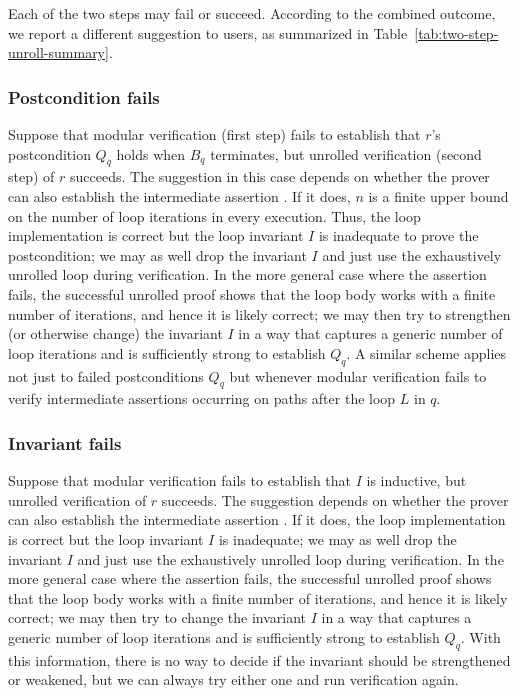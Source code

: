 Each of the two steps may fail or succeed.
According to the combined outcome, we report a different suggestion to users, as summarized in Table~\ref{tab:two-step-unroll-summary}.

\subsubsection{Postcondition fails}

Suppose that modular verification (first step) fails to establish that $r$'s postcondition $Q_q$ holds when $B_q$ terminates, but unrolled verification (second step) of $r$ succeeds.
The suggestion in this case depends on whether the prover can also establish the intermediate assertion .
If it does, $n$ is a finite upper bound on the number of loop iterations in every execution.
Thus, the loop implementation is correct but the loop invariant $I$ is inadequate to prove the postcondition; we may as well drop the invariant $I$ and just use the exhaustively unrolled loop during verification.
In the more general case where the assertion  fails, the successful unrolled proof shows that the loop body works with a finite number of iterations, and hence it is likely correct; we may then try to strengthen (or otherwise change) the invariant $I$ in a way that captures a generic number of loop iterations and is sufficiently strong to establish $Q_q$.
A similar scheme applies not just to failed postconditions $Q_q$ but whenever modular verification fails to verify intermediate assertions occurring on paths after the loop $L$ in $q$.


\subsubsection{Invariant fails}

Suppose that modular verification fails to establish that $I$ is inductive, but unrolled verification of $r$ succeeds.
The suggestion depends on whether the prover can also establish the intermediate assertion .
If it does, the loop implementation is correct but the loop invariant $I$ is inadequate; we may as well drop the invariant $I$ and just use the exhaustively unrolled loop during verification.
In the more general case where the assertion  fails, the successful unrolled proof shows that the loop body works with a finite number of iterations, and hence it is likely correct; we may then try to change the invariant $I$ in a way that captures a generic number of loop iterations and is sufficiently strong to establish $Q_q$.
With this information, there is no way to decide if the invariant should be strengthened or weakened, but we can always try either one and run verification again.

